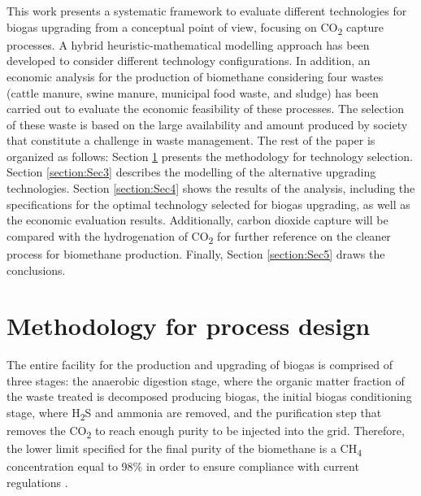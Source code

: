 \begin{refsection}[referencesCh7]
This work presents a systematic framework to evaluate different technologies for biogas upgrading from a conceptual point of view,
focusing on CO\textsubscript{2} capture processes. A hybrid heuristic-mathematical modelling approach has been developed to
consider different technology configurations. In addition, an economic analysis for the production of biomethane considering four
wastes (cattle manure, swine manure, municipal food waste, and sludge) has been carried out to evaluate the economic feasibility of these processes. The selection of these waste is based on the large availability and amount produced by society that constitute a challenge in waste management. The rest of the paper is organized as follows: Section \ref{section:Sec2} presents the methodology for technology selection. Section \ref{section:Sec3} describes the modelling of the alternative upgrading technologies. Section \ref{section:Sec4} shows the results of the analysis, including the specifications for the optimal technology selected for biogas upgrading, as well as the economic evaluation results. Additionally, carbon dioxide capture will be compared with the hydrogenation of CO\textsubscript{2} for further reference on the cleaner process for biomethane production. Finally, Section \ref{section:Sec5} draws the conclusions.


\section{Methodology for process design}\label{section:Sec2}
The entire facility for the production and upgrading of biogas is comprised of three stages: the anaerobic digestion stage, where the organic matter fraction of the waste treated is decomposed producing biogas, the initial biogas conditioning stage, where H\textsubscript{2}S and ammonia are removed, and the purification step that removes the CO\textsubscript{2} to reach enough purity to be injected into the grid. Therefore, the lower limit specified for the final purity of the biomethane is a CH\textsubscript{4} concentration equal to 98\% in order to ensure compliance with current regulations \citep{SpanishMinistryofIndustry}.


\end{refsection}
